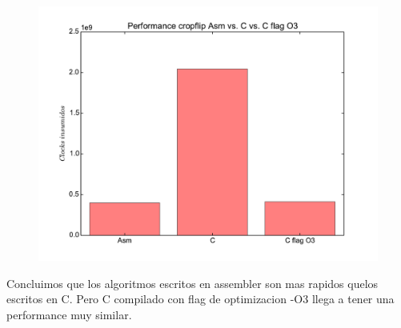 \newpage

\begin{figure}
  \begin{center}
	\includegraphics[scale=0.5]{cropflip.pdf}
  \end{center}
\end{figure}


Concluimos que los algoritmos escritos en assembler son mas rapidos quelos escritos en C. Pero C compilado con flag de optimizacion -O3 llega a tener una performance muy similar.  \\

\newpage